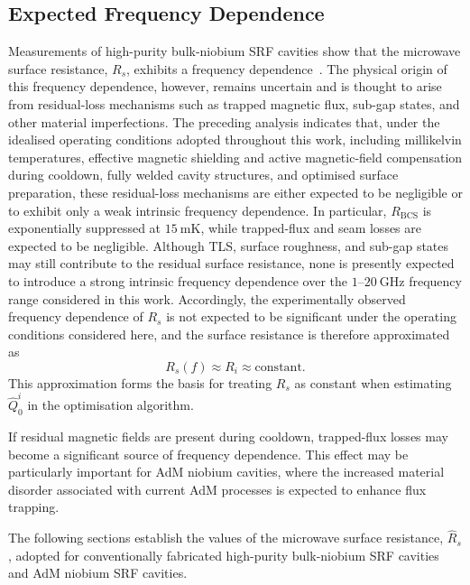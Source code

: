 \documentclass[
  aps,
  physrev,
  reprint,
  superscriptaddress,
  nofootinbib,
  amsmath,
  amssymb
]{revtex4-2}
\begin{document}
\subsection[\appendixname~\thesubsection]{Expected Frequency Dependence}
\label{app:freq_dep_Rs}

Measurements of high-purity bulk-niobium SRF cavities show that the microwave surface resistance, $R_s$, exhibits a frequency dependence~\cite{Raut2023}. The physical origin of this frequency dependence, however, remains uncertain and is thought to arise from residual-loss mechanisms such as trapped magnetic flux, sub-gap states, and other material imperfections. The preceding analysis indicates that, under the idealised operating conditions adopted throughout this work, including millikelvin temperatures, effective magnetic shielding and active magnetic-field compensation during cooldown, fully welded cavity structures, and optimised surface preparation, these residual-loss mechanisms are either expected to be negligible or to exhibit only a weak intrinsic frequency dependence. In particular, $R_{\mathrm{BCS}}$ is exponentially suppressed at $15~\mathrm{mK}$, while trapped-flux and seam losses are expected to be negligible. Although TLS, surface roughness, and sub-gap states may still contribute to the residual surface resistance, none is presently expected to introduce a strong intrinsic frequency dependence over the $1$–$20~\mathrm{GHz}$ frequency range considered in this work. Accordingly, the experimentally observed frequency dependence of $R_s$ is not expected to be significant under the operating conditions considered here, and the surface resistance is therefore approximated as
\begin{equation}
\boxed{R_s(f)\approx R_i \approx \mathrm{constant}.}
\end{equation}
This approximation forms the basis for treating $R_s$ as constant when estimating $\hat{Q}_0^i$ in the optimisation algorithm.

If residual magnetic fields are present during cooldown, trapped-flux losses may become a significant source of frequency dependence. This effect may be particularly important for AdM niobium cavities, where the increased material disorder associated with current AdM processes is expected to enhance flux trapping.

The following sections establish the values of the microwave surface resistance, $\hat{R}_s$, adopted for conventionally fabricated high-purity bulk-niobium SRF cavities and AdM niobium SRF cavities.
\end{document}
